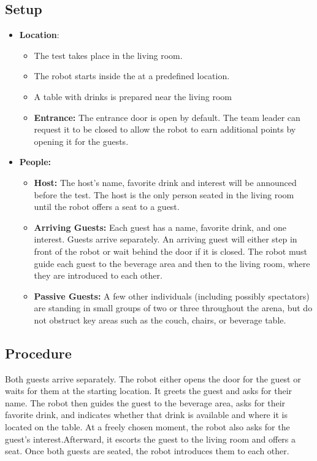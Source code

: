 \subsection*{Setup}
\begin{itemize}
	\item \textbf{Location}: 
	\begin{itemize}
	\item The test takes place in the living room.	
	\item The robot starts inside the \Arena{} at a predefined location.
	\item A table with drinks is prepared near the living room
	\item \textbf{Entrance:} The entrance door is open by default. The team leader can request it to be closed to allow the robot to earn additional points by opening it for the guests.
	\end{itemize}
	
	\item \textbf{People:} 
	\begin{itemize}
	\item \textbf{Host:} The host's name, favorite drink and interest will be announced before the test. The host is the only person seated in the living room until the robot offers a seat to a guest.

	\item \textbf{Arriving Guests:} Each guest has a name, favorite drink, and one interest.
	Guests arrive separately.
	An arriving guest will either step in front of the robot or wait behind the door if it is closed. 
	The robot must guide each guest to the beverage area and then to the living room, where they are introduced to each other.
	
	\item \textbf{Passive Guests:} A few other individuals (including possibly spectators) are standing in small groups of two or three throughout the arena, but do not obstruct key areas such as the couch, chairs, or beverage table.
	\end{itemize}

\end{itemize}

\subsection*{Procedure}
Both guests arrive separately. The robot either opens the door for the guest or waits for them at the starting location. 
It greets the guest and asks for their name.
The robot then guides the guest to the beverage area, asks for their favorite drink, and indicates whether that drink is available and where it is located on the table.
At a freely chosen moment, the robot also asks for the guest's interest.Afterward, it escorts the guest to the living room and offers a seat. Once both guests are seated, the robot introduces them to each other.

